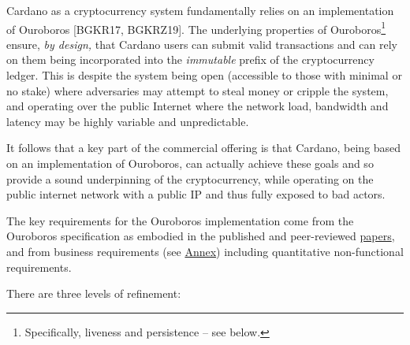\documentclass[]{article}
\begin{document}
Cardano as a cryptocurrency system fundamentally relies on an
implementation of Ouroboros {[}BGKR17, BGKRZ19{]}. The underlying
properties of Ouroboros\footnote{Specifically, liveness and persistence
  -- see below.} ensure, \emph{by design,} that Cardano users can submit
valid transactions and can rely on them being incorporated into the
\emph{immutable} prefix of the cryptocurrency ledger. This is despite
the system being open (accessible to those with minimal or no stake)
where adversaries may attempt to steal money or cripple the system, and
operating over the public Internet where the network load, bandwidth and
latency may be highly variable and unpredictable.

It follows that a key part of the commercial offering is that Cardano,
being based on an implementation of Ouroboros, can actually achieve
these goals and so provide a sound underpinning of the cryptocurrency,
while operating on the public internet network with a public IP and thus
fully exposed to bad actors.

The key requirements for the Ouroboros implementation come from the
Ouroboros specification as embodied in the published and peer-reviewed
\href{https://iohk.io/research/papers/}{{papers}}, and from business
requirements (see \protect\hyperlink{business-requirements}{{Annex}})
including quantitative non-functional requirements.

There are three levels of refinement:
\end{document}
